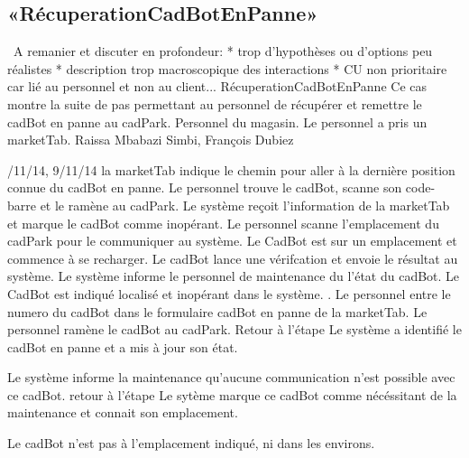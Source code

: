 \subsection{«RécuperationCadBotEnPanne»}
\TODO\ A remanier et discuter en profondeur: 
* trop d'hypothèses ou d'options peu réalistes
* description trop macroscopique des interactions
* CU non prioritaire car lié au personnel et non au client...
\startCU
\nom RécuperationCadBotEnPanne
\but Ce cas montre la suite de pas permettant au personnel de récupérer et remettre le cadBot en panne au cadPark.
\acteur Personnel du magasin.
\precondition Le personnel a pris un marketTab.
\auteur Raissa Mbabazi Simbi, François Dubiez
\date 7/11/14, 9/11/14
\nominal %
\startnominal
{} la marketTab indique le chemin pour aller à la dernière position connue du cadBot en panne.
\etape[RCP:SE1] Le personnel trouve le cadBot, scanne son code-barre et le ramène au cadPark.
\etape Le système reçoit l'information de la marketTab et marque le cadBot comme inopérant.
\etape Le personnel scanne l'emplacement du cadPark pour le communiquer au système.
 Le CadBot est sur un emplacement et commence à se recharger.
 Le cadBot lance une vérifcation et envoie le résultat au système. 
\etape Le système informe le personnel de maintenance du l'état du cadBot.
\stopnominal
\postcondition Le CadBot est indiqué localisé et inopérant dans le système.
.
\alternatifs
\startalternatif[RCP:SE1]
\etape Le personnel entre le numero du cadBot dans le formulaire cadBot en panne de la marketTab.
\etape Le personnel ramène le cadBot au cadPark.
\etape Retour à l'étape 
\stopcondition
\postcondition Le système a identifié le cadBot en panne et a mis à jour son état.
\stopalternatif


\etape Le système informe la maintenance qu'aucune communication n'est possible avec ce cadBot.
\etape retour à l'étape 
\stopcondition
\postcondition Le sytème marque ce cadBot comme nécéssitant de la maintenance et connait son emplacement.
\stopalternatif


\exception
Le cadBot n'est pas à l'emplacement indiqué, ni dans les environs.
\stopCU
